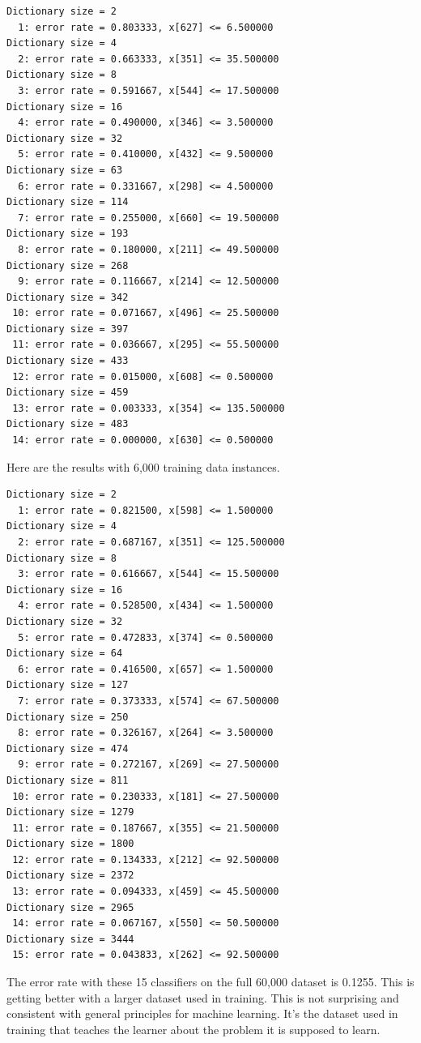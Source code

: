 \documentclass{article}
\begin{document}
\begin{verbatim}
Dictionary size = 2
  1: error rate = 0.803333, x[627] <= 6.500000
Dictionary size = 4
  2: error rate = 0.663333, x[351] <= 35.500000
Dictionary size = 8
  3: error rate = 0.591667, x[544] <= 17.500000
Dictionary size = 16
  4: error rate = 0.490000, x[346] <= 3.500000
Dictionary size = 32
  5: error rate = 0.410000, x[432] <= 9.500000
Dictionary size = 63
  6: error rate = 0.331667, x[298] <= 4.500000
Dictionary size = 114
  7: error rate = 0.255000, x[660] <= 19.500000
Dictionary size = 193
  8: error rate = 0.180000, x[211] <= 49.500000
Dictionary size = 268
  9: error rate = 0.116667, x[214] <= 12.500000
Dictionary size = 342
 10: error rate = 0.071667, x[496] <= 25.500000
Dictionary size = 397
 11: error rate = 0.036667, x[295] <= 55.500000
Dictionary size = 433
 12: error rate = 0.015000, x[608] <= 0.500000
Dictionary size = 459
 13: error rate = 0.003333, x[354] <= 135.500000
Dictionary size = 483
 14: error rate = 0.000000, x[630] <= 0.500000
 \end{verbatim}

Here are the results with 6,000 training data instances.
\begin{verbatim}
Dictionary size = 2
  1: error rate = 0.821500, x[598] <= 1.500000
Dictionary size = 4
  2: error rate = 0.687167, x[351] <= 125.500000
Dictionary size = 8
  3: error rate = 0.616667, x[544] <= 15.500000
Dictionary size = 16
  4: error rate = 0.528500, x[434] <= 1.500000
Dictionary size = 32
  5: error rate = 0.472833, x[374] <= 0.500000
Dictionary size = 64
  6: error rate = 0.416500, x[657] <= 1.500000
Dictionary size = 127
  7: error rate = 0.373333, x[574] <= 67.500000
Dictionary size = 250
  8: error rate = 0.326167, x[264] <= 3.500000
Dictionary size = 474
  9: error rate = 0.272167, x[269] <= 27.500000
Dictionary size = 811
 10: error rate = 0.230333, x[181] <= 27.500000
Dictionary size = 1279
 11: error rate = 0.187667, x[355] <= 21.500000
Dictionary size = 1800
 12: error rate = 0.134333, x[212] <= 92.500000
Dictionary size = 2372
 13: error rate = 0.094333, x[459] <= 45.500000
Dictionary size = 2965
 14: error rate = 0.067167, x[550] <= 50.500000
Dictionary size = 3444
 15: error rate = 0.043833, x[262] <= 92.500000
\end{verbatim}
The error rate with these 15 classifiers on the full 60,000 dataset is 0.1255.  This is getting better with a larger dataset used in training.  This is not surprising and consistent with general principles for machine learning.  It's the dataset used in training that teaches the learner about the problem it is supposed to learn.



\end{document}
